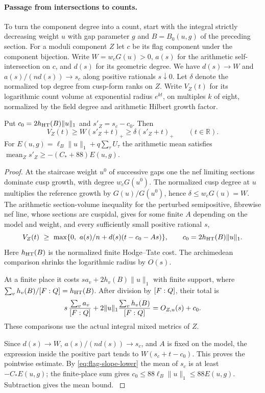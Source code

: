 \paragraph{Passage from intersections to counts.}
To turn the component degree into a count, start with the integral strictly decreasing
weight \(u\) with
gap parameter \(g\) and \(B=B_0(u,g)\) of the preceding
section. For a moduli component \(Z\) let \(c\) be its flag
component under the component bijection. Write
\(W=w_cG(u)>0\), \(a(s)\) for the arithmetic
self-intersection on \(c\), and \(d(s)\) for its geometric
degree. We have \(d(s)\to W\) and \(a(s)/(nd(s))\to s_c\)
along positive rationals \(s\downarrow0\). Let \(\delta\)
denote the normalized top degree from cusp-form ranks on \(Z\).
Write \(V_Z(t)\) for its logarithmic count volume at exponential
radius \(e^{kt}\), on multiples \(k\) of eight, normalized by the
field degree and arithmetic Hilbert growth factor.

\begin{lemma}
Put \(c_0=2h_{\rm HT}(B)\|u\|_1\) and \(s'_Z=s_c-c_0\). Then
\[
 V_Z(t)\ge W(s'_Z+t)_+\ge\delta(s'_Z+t)_+\qquad(t\in\mathbb R).
\]
For \(E(u,g)=\ell_B\|u\|_1+q\sum_\tau U_\tau\) the arithmetic
mean satisfies \(\operatorname{mean}_Z s'_Z\ge-(C_*+88)E(u,g)\).
\end{lemma}
\begin{proof}
At the staircase weight \(u^0\) of successive gaps one the nef
limiting sections dominate cusp growth, with degree \(w_cG(u^0)\).
The normalized cusp degree at \(u\) multiplies the reference growth
by \(G(u)/G(u^0)\), hence \(\delta\le w_cG(u)=W\). \label{cor:covolume-component-transfer-3}
The arithmetic section-volume inequality for the perturbed
semipositive, fibrewise nef line, whose sections are cuspidal, gives
for some finite \(A\) depending on the model and weight, and every
sufficiently small positive rational \(s\),
\[
 V_Z(t)\ \ge\
 \max\{0,\ a(s)/n+d(s)(t-c_0-As)\},\qquad
 c_0=2h_{\rm HT}(B)\|u\|_1 .
\]
Here \(h_{\rm HT}(B)\) is the normalized finite Hodge--Tate cost.
The archimedean comparison shrinks the logarithmic radius by \(O(s)\).

At a finite place it costs \(s a_v+2 h_v(B)\|u\|_1\) with
finite support, where \(\sum_v h_v(B)/[F:Q]=h_{\rm HT}(B)\).
After division by \([F:Q]\), their total is
\[
 s\,\frac{\sum_v a_v}{[F:Q]}
       +2\|u\|_1\frac{\sum_v h_v(B)}{[F:Q]}
   = O_{Z,u}(s)+c_0 .
\] These comparisons use the
actual integral mixed metrics of \(Z\).
\label{cor:covolume-component-transfer-4}

Since \(d(s)\to W\), \(a(s)/(nd(s))\to s_c\), and \(A\) is fixed
on the model, the expression inside the positive part tends to
\(W(s_c+t-c_0)\). This proves the pointwise estimate. By
\eqref{eq:flag-slope-lower} the mean of \(s_c\) is at least
\(-C_*E(u,g)\); the finite-place sum gives
\(c_0\le88\ell_B\|u\|_1\le88E(u,g)\). Subtraction gives the mean
bound. \label{cor:covolume-component-transfer-5}
\end{proof}

